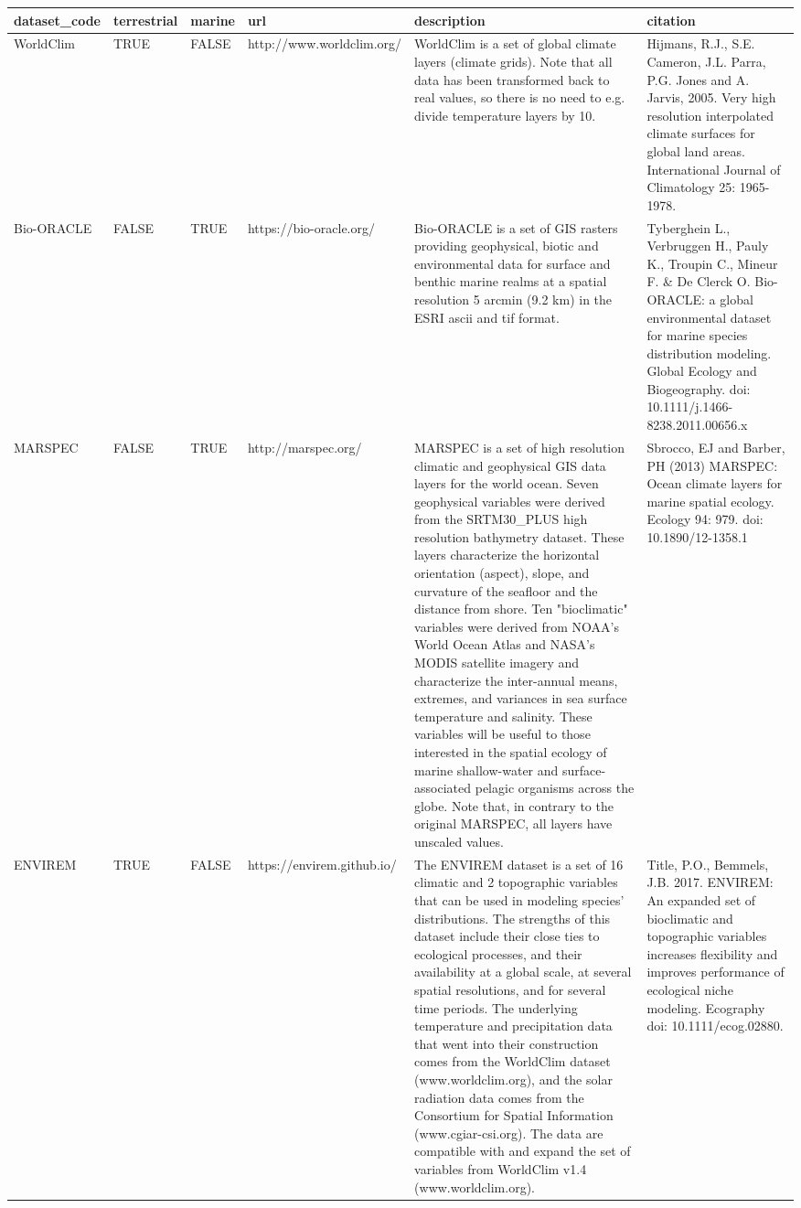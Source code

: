 \documentclass[
]{book}
\begin{document}
\begin{table}
\centering
\begin{tabular}{l|l|l|l|l|l}
\hline
dataset\_code & terrestrial & marine & url & description & citation\\
\hline
WorldClim & TRUE & FALSE & http://www.worldclim.org/ & WorldClim is a set of global climate layers (climate grids). Note that all data has been transformed back to real values, so there is no need to e.g. divide temperature layers by 10. & Hijmans, R.J., S.E. Cameron, J.L. Parra, P.G. Jones and A. Jarvis, 2005. Very high resolution interpolated climate surfaces for global land areas. International Journal of Climatology 25: 1965-1978.\\
\hline
Bio-ORACLE & FALSE & TRUE & https://bio-oracle.org/ & Bio-ORACLE is a set of GIS rasters providing geophysical, biotic and environmental data for surface and benthic marine realms at a spatial resolution 5 arcmin (9.2 km) in the ESRI ascii and tif format. & Tyberghein L., Verbruggen H., Pauly K., Troupin C., Mineur F. \& De Clerck O. Bio-ORACLE: a global environmental dataset for marine species distribution modeling. Global Ecology and Biogeography. doi: 10.1111/j.1466-8238.2011.00656.x\\
\hline
MARSPEC & FALSE & TRUE & http://marspec.org/ & MARSPEC is a set of high resolution climatic and geophysical GIS data layers for the world ocean. Seven geophysical variables were derived from the SRTM30\_PLUS high resolution bathymetry dataset.  These layers characterize the horizontal orientation (aspect), slope, and curvature of the seafloor and the distance from shore.  Ten "bioclimatic" variables were derived from NOAA's World Ocean Atlas and NASA's MODIS satellite imagery and characterize the inter-annual means, extremes, and variances in sea surface temperature and salinity. These variables will be useful to those interested in the spatial ecology of marine shallow-water and surface-associated pelagic organisms across the globe. Note that, in contrary to the original MARSPEC, all layers have unscaled values. & Sbrocco, EJ and Barber, PH (2013) MARSPEC: Ocean climate layers for marine spatial ecology. Ecology 94: 979. doi: 10.1890/12-1358.1\\
\hline
ENVIREM & TRUE & FALSE & https://envirem.github.io/ & The ENVIREM dataset is a set of 16 climatic and 2 topographic variables that can be used in modeling species' distributions. The strengths of this dataset include their close ties to ecological processes, and their availability at a global scale, at several spatial resolutions, and for several time periods. The underlying temperature and precipitation data that went into their construction comes from the WorldClim dataset (www.worldclim.org), and the solar radiation data comes from the Consortium for Spatial Information (www.cgiar-csi.org). The data are compatible with and expand the set of variables from WorldClim v1.4 (www.worldclim.org). & Title, P.O., Bemmels, J.B. 2017. ENVIREM: An expanded set of bioclimatic and topographic variables increases flexibility and improves performance of ecological niche modeling. Ecography doi: 10.1111/ecog.02880.\\

\end{tabular}
\end{table}
\end{document}
